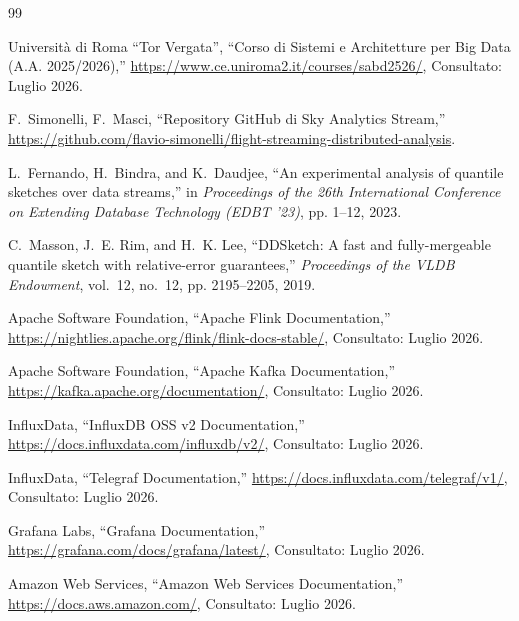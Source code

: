 \documentclass[conference]{IEEEtran}
\begin{document}
\begin{thebibliography}{99}
\setlength{\itemsep}{0.5pt}
\setlength{\parsep}{0pt}

    Università di Roma ``Tor Vergata'', ``Corso di Sistemi e Architetture per Big Data (A.A. 2025/2026),''
    \url{https://www.ce.uniroma2.it/courses/sabd2526/}, Consultato: Luglio 2026.
    
    F.~Simonelli, F.~Masci, ``Repository GitHub di Sky Analytics Stream,''
    \url{https://github.com/flavio-simonelli/flight-streaming-distributed-analysis}.
    
    L.~Fernando, H.~Bindra, and K.~Daudjee, ``An experimental analysis of quantile sketches over data streams,''
    in \emph{Proceedings of the 26th International Conference on Extending Database Technology (EDBT '23)},
    pp. 1--12, 2023.
    
    C.~Masson, J.~E. Rim, and H.~K. Lee, ``DDSketch: A fast and fully-mergeable quantile sketch with relative-error guarantees,''
    \emph{Proceedings of the VLDB Endowment}, vol.~12, no.~12, pp. 2195--2205, 2019.
    
    Apache Software Foundation, ``Apache Flink Documentation,''
    \url{https://nightlies.apache.org/flink/flink-docs-stable/}, Consultato: Luglio 2026.
    
    Apache Software Foundation, ``Apache Kafka Documentation,''
    \url{https://kafka.apache.org/documentation/}, Consultato: Luglio 2026.
    
    InfluxData, ``InfluxDB OSS v2 Documentation,''
    \url{https://docs.influxdata.com/influxdb/v2/}, Consultato: Luglio 2026.
    
    
    InfluxData, ``Telegraf Documentation,''
    \url{https://docs.influxdata.com/telegraf/v1/}, Consultato: Luglio 2026.
    
    Grafana Labs, ``Grafana Documentation,''
    \url{https://grafana.com/docs/grafana/latest/}, Consultato: Luglio 2026.
    
    Amazon Web Services, ``Amazon Web Services Documentation,''
    \url{https://docs.aws.amazon.com/}, Consultato: Luglio 2026.
    
\end{thebibliography}
\end{document}
